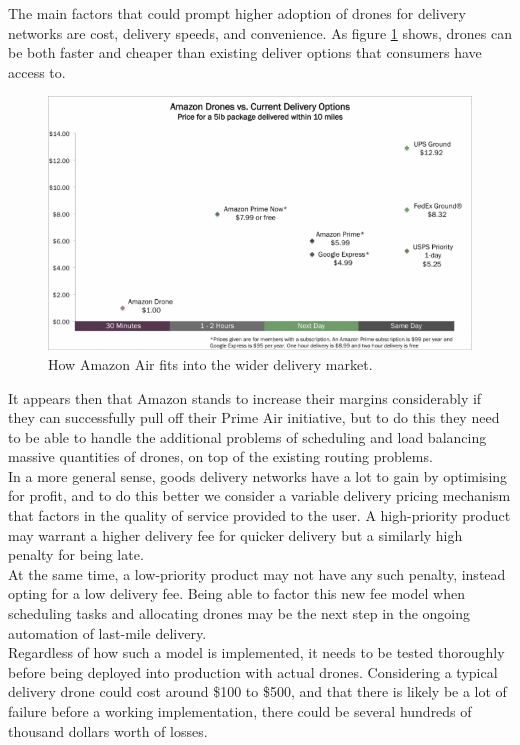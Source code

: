 \documentclass[a4paper,11pt,titlepage]{report}
\begin{document}
The main factors that could prompt higher adoption of drones for delivery networks are cost, delivery speeds, and convenience. As figure \ref{fig:drone_del_cost} shows, drones can be both faster and cheaper than existing deliver options that consumers have access to.
\begin{figure}[!hbpt]
  \center
  \includegraphics[width=\linewidth]{img/ark-invest-drones-analysis-768x460.png}
  \caption{How Amazon Air fits into the wider delivery market. \cite{Wang}}
  \label{fig:drone_del_cost}
\end{figure}

It appears then that Amazon stands to increase their margins considerably if they can successfully pull off their Prime Air initiative\cite{Welch2015}, but to do this they need to be able to handle the additional problems of scheduling and load balancing massive quantities of drones, on top of the existing routing problems. \\

In a more general sense, goods delivery networks have a lot to gain by optimising for profit, and to do this better we consider a variable delivery pricing mechanism that factors in the quality of service provided to the user. A high-priority product may warrant a higher delivery fee for quicker delivery but a similarly high penalty for being late.\\

At the same time, a low-priority product may not have any such penalty, instead opting for a low delivery fee. Being able to factor this new fee model when scheduling tasks and allocating drones may be the next step in the ongoing automation of last-mile delivery\cite{Joerss2016}.\\

Regardless of how such a model is implemented, it needs to be tested thoroughly before being deployed into production with actual drones. Considering a typical delivery drone could cost around \$100 to \$500\cite{Menon2013}, and that there is likely be a lot of failure before a working implementation, there could be several hundreds of thousand dollars worth of losses. \\
\end{document}

